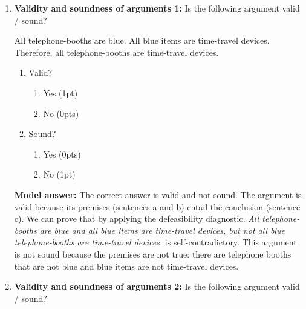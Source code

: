 \documentclass[a4,11pt]{article}
\begin{document}
\begin{enumerate}[leftmargin = 12pt]
{\bf Model answer:} The correct answer is presupposition. First, we apply the defeasibility diagnostic: because {\em The flying saucer the flying saucer has come sometime in the past} is self-contradictory, B is a non-defeasible inference of sentence A. Next, we apply the projection diagnostic. The relevant versions of sentence A are the following: {\em The flying saucer did not come again}, {\em Did the flying saucer come again?} and {\em If the flying saucer came again, Mulder will be happy.}  Because sentence A implies inference B, and the versions of sentence A also imply B, B is not an ordinary entailment but a presupposition.

 
\item {\bf Validity and soundness of arguments 1:} Is the following argument valid / sound?
\begin{exe}
\ex
\begin{xlist}
\ex All telephone-booths are blue.
\ex All blue items are time-travel devices.
\ex Therefore, all telephone-booths are time-travel devices.
\end{xlist}
\end{exe}
 \begin{enumerate}[noitemsep]
    \item Valid? 
    \begin{enumerate}[noitemsep]
   \item Yes (1pt) 
  \item No (0pts)
  \end{enumerate}
    \item Sound?
        \begin{enumerate}[noitemsep]
       \item  Yes (0pts) 
       \item No (1pt)
           \end{enumerate}
\end{enumerate}

 {\bf Model answer:} The correct answer is valid and not sound. The argument is valid because its premises (sentences a and b) entail the conclusion (sentence c). We can prove that by applying the defeasibility diagnostic. {\em All telephone-booths are blue and all blue items are time-travel devices, but not all blue telephone-booths are time-travel devices.} is self-contradictory. This argument is not sound because the premises are not true: there are telephone booths that are not blue and blue items are not time-travel devices.

\item {\bf Validity and soundness of arguments 2:} Is the following argument valid / sound?


\end{enumerate}
\end{document}
